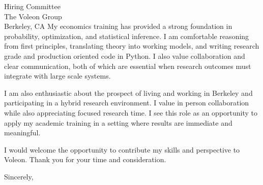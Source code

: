 \documentclass[11pt]{letter}
\begin{document}
\begin{letter}{Hiring Committee \\ The Voleon Group \\ Berkeley, CA}
My economics training has provided a strong foundation in probability, optimization, and statistical inference. I am comfortable reasoning from first principles, translating theory into working models, and writing research grade and production oriented code in Python. I also value collaboration and clear communication, both of which are essential when research outcomes must integrate with large scale systems.

I am also enthusiastic about the prospect of living and working in Berkeley and participating in a hybrid research environment. I value in person collaboration while also appreciating focused research time. I see this role as an opportunity to apply my academic training in a setting where results are immediate and meaningful.

I would welcome the opportunity to contribute my skills and perspective to Voleon. Thank you for your time and consideration.

\closing{Sincerely,}

\end{letter}
\end{document}

